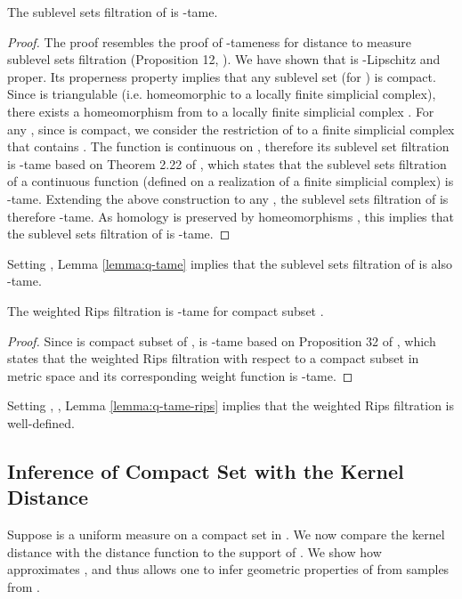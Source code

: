 \documentclass[11pt]{myclass}
\begin{document}
\begin{lemma}
The sublevel sets filtration of  is -tame. 
\label{lemma:q-tame}
\end{lemma}
\begin{proof}
The proof resembles the proof of -tameness for distance to measure sublevel sets filtration (Proposition 12, \cite{BuchetChazalOudot2013}). 
We have shown that  is -Lipschitz and proper. Its properness property implies that any sublevel set  (for ) is compact. 
Since  is triangulable (i.e. homeomorphic to a locally finite simplicial complex), there exists a homeomorphism  from  to a locally finite simplicial complex . 
For any , since  is compact, we consider the restriction of  to a finite simplicial complex  that contains . 
The function  is continuous on , 
therefore its sublevel set filtration is -tame based on 
Theorem 2.22 of \cite{ChazalSilvaGlisse2013}, which states that the sublevel sets filtration of a continuous function (defined on a realization of a finite simplicial complex) is -tame. 
Extending the above construction to any , the sublevel sets filtration of  is therefore -tame. 
As homology is preserved by homeomorphisms , this implies that the sublevel sets filtration of  is -tame. 
\end{proof}

Setting , Lemma \ref{lemma:q-tame} implies that the sublevel sets filtration of  is also -tame. 

\begin{lemma}
The weighted Rips filtration  is -tame for compact subset . 
\label{lemma:q-tame-rips}
\end{lemma}
\begin{proof}
Since  is compact subset of ,  is -tame based on Proposition 32 of \cite{ChazalSilvaGlisse2013}, which states that the weighted Rips filtration with respect to a compact subset  in metric space and its corresponding weight function is -tame. 
\end{proof}

Setting , , Lemma \ref{lemma:q-tame-rips} implies that the weighted Rips filtration  is well-defined. 



\subsection{Inference of Compact Set  with the Kernel Distance}
\label{app:infer}

Suppose  is a uniform measure on a compact set  in . 
We now compare the kernel distance  with the distance function  to the support  of . We show how  approximates , and thus allows one to infer geometric properties of  from samples from . 
\end{document}
